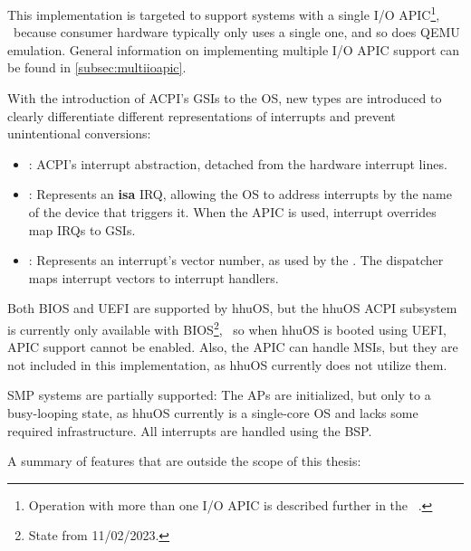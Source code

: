 This implementation is targeted to support systems with a single I/O APIC\footnote{
  Operation with more than one I/O APIC is described further in the ~\autocite[sec.~3.6.8]{mpspec}.},
\ because consumer hardware typically only uses a single one, and so does QEMU emulation.
General information on implementing multiple I/O APIC support can be found in \autoref{subsec:multiioapic}.

With the introduction of ACPI's GSIs to the OS, new types are introduced to clearly differentiate different representations of interrupts and prevent unintentional conversions:

\begin{itemize}
  \item {}: ACPI's interrupt abstraction, detached from the hardware interrupt lines.
  \item {}: Represents an \textbf{\gls{isa}} IRQ, allowing the OS to address interrupts by the name of the device that triggers it.
        When the APIC is used, interrupt overrides map IRQs to GSIs.
  \item {}: Represents an interrupt's vector number, as used by the .
        The dispatcher maps interrupt vectors to interrupt handlers.
\end{itemize}

Both BIOS and UEFI are supported by hhuOS, but the hhuOS ACPI subsystem is currently only available with BIOS\footnote{
  State from 11/02/2023.},
\ so when hhuOS is booted using UEFI, APIC support cannot be enabled.
Also, the APIC can handle MSIs, but they are not included in this implementation, as hhuOS currently does not utilize them.

SMP systems are partially supported: The APs are initialized, but only to a busy-looping state, as hhuOS currently is a single-core OS and lacks some required infrastructure.
All interrupts are handled using the BSP\@.

A summary of features that are outside the scope of this thesis:

